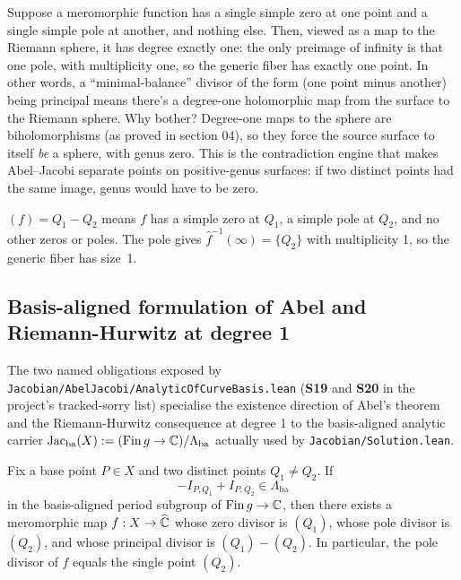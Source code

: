 \begin{layman}
Suppose a meromorphic function has a single simple zero at one point
and a single simple pole at another, and nothing else. Then, viewed as
a map to the Riemann sphere, it has degree exactly one: the only
preimage of infinity is that one pole, with multiplicity one, so the
generic fiber has exactly one point. In other words, a
``minimal-balance'' divisor of the form (one point minus another) being
principal means there's a degree-one holomorphic map from the surface
to the Riemann sphere. Why bother? Degree-one maps to the sphere are
biholomorphisms (as proved in section 04), so they force the source
surface to itself \emph{be} a sphere, with genus zero. This is the
contradiction engine that makes Abel--Jacobi separate points on
positive-genus surfaces: if two distinct points had the same image,
genus would have to be zero.
\end{layman}

\begin{proofsketch}
\((f)=Q_1-Q_2\) means \(f\) has a simple zero at \(Q_1\), a simple pole
at \(Q_2\), and no other zeros or poles. The pole gives \(\widehat
f^{-1}(\infty)=\{Q_2\}\) with multiplicity 1, so the generic fiber has
size~1.
\end{proofsketch}



\subsection{Basis-aligned formulation of Abel and Riemann-Hurwitz at
degree 1}

The two named obligations exposed by
\texttt{Jacobian/AbelJacobi/AnalyticOfCurveBasis.lean}
(\textbf{S19} and \textbf{S20} in the project's tracked-sorry list)
specialise the existence direction of Abel's theorem and the
Riemann-Hurwitz consequence at degree 1 to the basis-aligned
analytic carrier
\(\mathrm{Jac}_{\mathrm{ba}}(X) := (\mathrm{Fin}\,g \to \mathbb{C}) /
\Lambda_{\mathrm{ba}}\)
actually used by \texttt{Jacobian/Solution.lean}.

\begin{theorem}
\label{thm:abel-basis-aligned-two-point}
Fix a base point \(P\in X\) and two distinct points
\(Q_1\neq Q_2\). If
\[
   -I_{P,Q_1} + I_{P,Q_2} \in \Lambda_{\mathrm{ba}}
\]
in the basis-aligned period subgroup of \(\mathrm{Fin}\,g \to \mathbb{C}\),
then there exists a meromorphic map \(f : X \to \widehat{\mathbb{C}}\) whose
zero divisor is \((Q_1)\), whose pole divisor is \((Q_2)\), and whose
principal divisor is \((Q_1) - (Q_2)\). In particular, the pole
divisor of \(f\) equals the single point \((Q_2)\).
\leanok
\end{theorem}

